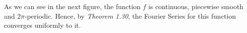 \begin{questions}

\begin{solution}
As we can see in the next figure, the function $f$ is continuous, piecewise smooth and $2\pi$-periodic. Hence, by \textsl{Theorem 1.30}, the Fourier Series for this function converges uniformly to it.
\end{solution}
\end{questions}

